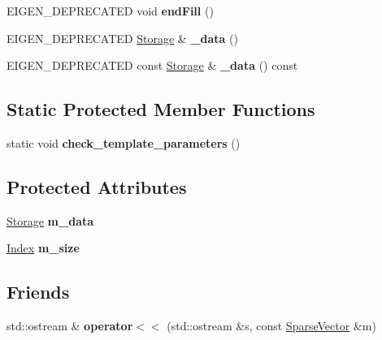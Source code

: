 \begin{DoxyCompactItemize}
E\+I\+G\+E\+N\+\_\+\+D\+E\+P\+R\+E\+C\+A\+T\+ED void {\bfseries end\+Fill} ()
\item 
\mbox{\label{class_eigen_1_1_sparse_vector_aafb0f5cd8a3e9128c9f4ffd33418df65}} 
E\+I\+G\+E\+N\+\_\+\+D\+E\+P\+R\+E\+C\+A\+T\+ED \mbox{\hyperlink{class_eigen_1_1internal_1_1_compressed_storage}{Storage}} \& {\bfseries \+\_\+data} ()
\item 
\mbox{\label{class_eigen_1_1_sparse_vector_a98518d2737a31dfa4153f32dd6164a59}} 
E\+I\+G\+E\+N\+\_\+\+D\+E\+P\+R\+E\+C\+A\+T\+ED const \mbox{\hyperlink{class_eigen_1_1internal_1_1_compressed_storage}{Storage}} \& {\bfseries \+\_\+data} () const
\end{DoxyCompactItemize}
\subsection*{Static Protected Member Functions}
\begin{DoxyCompactItemize}
\item 
\mbox{\label{class_eigen_1_1_sparse_vector_ac3a4ab0ff75ba4b4bdd711ebf3501784}} 
static void {\bfseries check\+\_\+template\+\_\+parameters} ()
\end{DoxyCompactItemize}
\subsection*{Protected Attributes}
\begin{DoxyCompactItemize}
\item 
\mbox{\label{class_eigen_1_1_sparse_vector_aa23353574434152dd19220b89ed9761a}} 
\mbox{\hyperlink{class_eigen_1_1internal_1_1_compressed_storage}{Storage}} {\bfseries m\+\_\+data}
\item 
\mbox{\label{class_eigen_1_1_sparse_vector_afb561f862a7dd20b40f65c234c8a339a}} 
\mbox{\hyperlink{struct_eigen_1_1_eigen_base_a554f30542cc2316add4b1ea0a492ff02}{Index}} {\bfseries m\+\_\+size}
\end{DoxyCompactItemize}
\subsection*{Friends}
\begin{DoxyCompactItemize}
\item 
\mbox{\label{class_eigen_1_1_sparse_vector_a6cf8a05d15fd30ee4fb01ecb778305c3}} 
std\+::ostream \& {\bfseries operator$<$$<$} (std\+::ostream \&s, const \mbox{\hyperlink{class_eigen_1_1_sparse_vector}{Sparse\+Vector}} \&m)
\end{DoxyCompactItemize}
